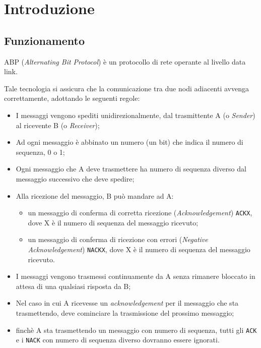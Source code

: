\section{Introduzione}

\subsection{Funzionamento}\label{sec:intro-abstract}
ABP (\emph{Alternating Bit Protocol}) è un protocollo di rete operante al
livello data link.

Tale tecnologia si assicura che la comunicazione tra due nodi adiacenti avvenga
correttamente, adottando le seguenti regole:

\begin{itemize}
  \item I messaggi vengono spediti unidirezionalmente, dal
    trasmittente A (o \emph{Sender}) al ricevente B (o \emph{Receiver});
  \item Ad ogni messaggio è abbinato un numero (un bit) che indica il numero di
    sequenza, 0 o 1;
  \item Ogni messaggio che A deve trasmettere ha numero di sequenza diverso dal
    messaggio successivo che deve spedire;
  \item Alla ricezione del messaggio, B può mandare ad A:
  \begin{itemize}
    \item un messaggio di conferma di corretta ricezione
      (\emph{Acknowledgement}) \texttt{ACKX}, dove X è il numero di sequenza
      del messaggio ricevuto;
    \item un messaggio di conferma di ricezione con errori
      (\emph{Negative Acknowledgement}) \texttt{NACKX}, dove X è il numero di
      sequenza del messaggio ricevuto.
  \end{itemize}
  \item I messaggi vengono trasmessi continuamente da A senza rimanere
    bloccato in attesa di una qualsiasi risposta da B;
  \item Nel caso in cui A ricevesse un \emph{acknowledgement} per il messaggio
    che sta trasmettendo, deve cominciare la trasmissione del prossimo
    messaggio;
  \item finchè A sta trasmettendo un messaggio con numero di sequenza, tutti
    gli \texttt{ACK} e i \texttt{NACK} con numero di sequenza diverso dovranno
    essere ignorati.
\end{itemize}
